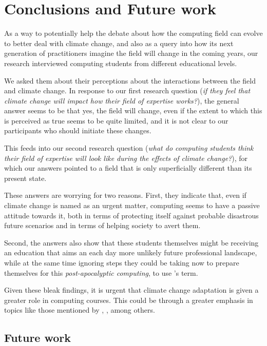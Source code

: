 
\section{Conclusions and Future work}
As a way to potentially help the debate about how the computing field can evolve to better deal with climate change, and also as a query into how its next generation of practitioners imagine the field will change in the coming years, our research interviewed computing students from different educational levels. 

We asked them about their perceptions about the interactions between the field and climate change. In response to our first research question (\emph{if they feel that climate change will impact how their field of expertise works?}), the general answer seems to be that yes, the field will change, even if the extent to which this is perceived as true seems to be quite limited, and it is not clear to our participants who should initiate these changes. 

This feeds into our second research question (\emph{what do computing students think their field of expertise will look like during the effects of climate change?}), for which our answers pointed to a field that is only superficially different than its present state.

These answers are worrying for two reasons. First, they indicate that, even if climate change is named as an urgent matter, computing seems to have a passive attitude towards it, both in terms of protecting itself against probable disastrous future scenarios and in terms of helping society to avert them. 

Second, the answers also show that these students themselves might be receiving an education that aims an each day more unlikely future professional landscape, while at the same time ignoring steps they could be taking now to prepare themselves for this \emph{post-apocalyptic computing}, to use \citeauthor{silberman2010precarious}'s term.

Given these bleak findings, it is urgent that climate change adaptation is given a greater role in computing courses. This could be through a greater emphasis in topics like those mentioned by \citeauthor{silberman2010precarious}, \citeauthor{easterbrook2010climate}, among others. 

\subsection{Future work}


